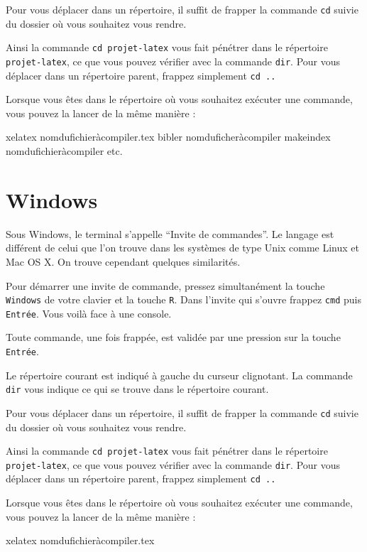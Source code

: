 Pour vous déplacer dans un répertoire, il suffit de frapper la commande
\verb|cd| suivie du dossier où vous souhaitez vous rendre.

Ainsi la commande \verb|cd projet-latex| vous fait pénétrer dans le
répertoire \verb|projet-latex|, ce que vous pouvez vérifier avec la
commande \verb|dir|. Pour vous déplacer dans un répertoire parent, frappez
simplement \verb|cd ..|

Lorsque vous êtes dans le répertoire où vous souhaitez exécuter une
commande, vous pouvez la lancer de la même manière :

\begin{bashcode}
xelatex nomdufichieràcompiler.tex
bibler nomduficheràcompiler
makeindex nomdufichieràcompiler
etc.
\end{bashcode}

\section{Windows}
Sous Windows, le terminal s'appelle \enquote{Invite de commandes}. Le langage
est différent de celui que l'on trouve dans les systèmes de type Unix comme
Linux et Mac OS X. On trouve cependant quelques similarités.

Pour démarrer une invite de commande, pressez simultanément la touche \verb|Windows| de votre
clavier et la touche \verb|R|. Dans l'invite qui s'ouvre frappez \verb|cmd| puis
\verb|Entrée|. Vous voilà face à une console.

Toute commande, une fois frappée, est validée par une pression sur la touche \verb|Entrée|.

Le répertoire courant est indiqué à gauche du curseur clignotant.
La commande \verb|dir| vous indique ce qui se trouve dans le répertoire
courant.

Pour vous déplacer dans un répertoire, il suffit de frapper la commande
\verb|cd| suivie du dossier où vous souhaitez vous rendre.

Ainsi la commande \verb|cd projet-latex| vous fait pénétrer dans le
répertoire \verb|projet-latex|, ce que vous pouvez vérifier avec la
commande \verb|dir|. Pour vous déplacer dans un répertoire parent, frappez
simplement \verb|cd ..|

Lorsque vous êtes dans le répertoire où vous souhaitez exécuter une
commande, vous pouvez la lancer de la même manière :

\begin{bashcode}
xelatex nomdufichieràcompiler.tex
\end{bashcode}

